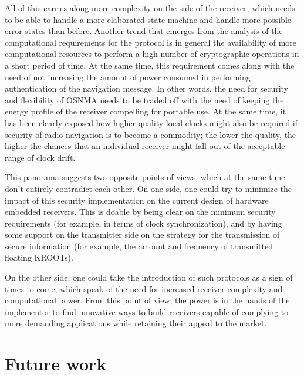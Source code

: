 All of this carries along more complexity on the side of the receiver, which
needs to be able to handle a more elaborated state machine and handle more
possible error states than before. Another trend that emerges from the analysis
of the computational requirements for the protocol is in general the
availability of more computational resources to perform a high number of
cryptographic operations in a short period of time. At the same time, this
requirement comes along with the need of not increasing the amount of power
consumed in performing authentication of the navigation message. In other words,
the need for security and flexibility of OSNMA needs to be traded off with the
need of keeping the energy profile of the receiver compelling for portable use.
At the same time, it has been clearly exposed how higher quality local clocks
might also be required if security of radio navigation is to become a commodity;
the lower the quality, the higher the chances that an individual receiver might
fall out of the acceptable range of clock drift.

\vspace{\baselineskip}

This panorama suggests two opposite points of views, which at the same time
don't entirely contradict each other. On one side, one could try to minimize the
impact of this security implementation on the current design of hardware
embedded receivers. This is doable by being clear on the minimum security
requirements (for example, in terms of clock synchronization), and by having
some support on the transmitter side on the strategy for the transmission of
secure information (for example, the amount and frequency of transmitted
floating KROOTs).

On the other side, one could take the introduction of such protocols as a sign
of times to come, which speak of the need for increased receiver complexity and
computational power. From this point of view, the power is in the hands of the
implementor to find innovative ways to build receivers capable of complying to
more demanding applications while retaining their appeal to the market.

\section{Future work}
